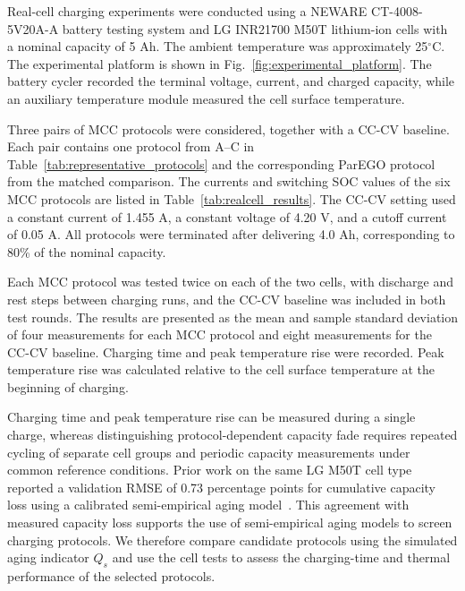 \documentclass[lettersize,journal]{IEEEtran}
\begin{document}
Real-cell charging experiments were conducted using a NEWARE
CT-4008-5V20A-A battery testing system and LG INR21700 M50T
lithium-ion cells with a nominal capacity of 5 Ah. The ambient
temperature was approximately 25$^\circ$C. The experimental
platform is shown in Fig.~\ref{fig:experimental_platform}.
The battery cycler recorded the terminal voltage, current,
and charged capacity, while an auxiliary temperature module
measured the cell surface temperature.

Three pairs of MCC protocols were considered, together with
a CC-CV baseline. Each pair contains one protocol from A--C
in Table~\ref{tab:representative_protocols} and the
corresponding ParEGO protocol from the matched comparison.
The currents and switching SOC values of the six MCC
protocols are listed in Table~\ref{tab:realcell_results}.
The CC-CV setting used a constant current of 1.455 A, a
constant voltage of 4.20 V, and a cutoff current of
0.05 A. All protocols were terminated after delivering
4.0 Ah, corresponding to 80\% of the nominal capacity.

Each MCC protocol was tested twice on each of the two cells,
with discharge and rest steps between charging runs, and the
CC-CV baseline was included in both test rounds. The results
are presented as the mean and sample standard deviation of
four measurements for each MCC protocol and eight
measurements for the CC-CV baseline. Charging time and peak
temperature rise were recorded. Peak temperature rise was
calculated relative to the cell surface temperature at the
beginning of charging.

Charging time and peak temperature rise can be measured during a single
charge, whereas distinguishing protocol-dependent capacity fade requires
repeated cycling of separate cell groups and periodic capacity measurements
under common reference conditions. Prior work on the same LG M50T cell
type reported a validation RMSE of 0.73 percentage points for cumulative
capacity loss using a calibrated semi-empirical aging model~\cite{refEIMO}.
This agreement with measured capacity loss supports the use of
semi-empirical aging models to screen charging protocols. We therefore
compare candidate protocols using the simulated aging indicator $Q_s$ and
use the cell tests to assess the charging-time and thermal performance of
the selected protocols.
\end{document}
